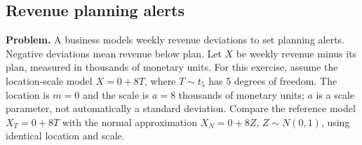 
\clearpage
\subsection{Revenue planning alerts}
\label{c9-d6}
\textbf{Problem.} A business models weekly revenue deviations to set planning alerts. Negative deviations mean revenue below plan. Let $X$ be weekly revenue minus its plan, measured in thousands of monetary units. For this exercise, assume the location-scale model $X=0+8T$, where $T\sim t_{5}$ has 5 degrees of freedom. The location is $m=0$ and the scale is $a=8$ thousands of monetary units; $a$ is a scale parameter, not automatically a standard deviation. Compare the reference model $X_T=0+8T$ with the normal approximation $X_N=0+8Z$, $Z\sim N(0,1)$, using identical location and scale.
